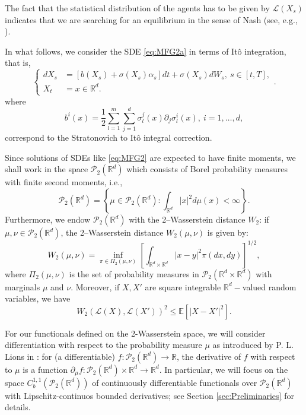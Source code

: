 \documentclass[12,english]{amsart}
\theoremstyle{plain}
\theoremstyle{definition}
\theoremstyle{plain}
\theoremstyle{plain}
\theoremstyle{remark}
\newcommand{\E}{\mathbb E}
\newcommand{\R}{\mathbb R}
\newcommand{\cL}{\mathcal L}
\newcommand{\cP}{\mathcal P}
\newcommand{\si}{\sigma}
\begin{document}
The fact that the statistical distribution of the agents has to be
given by $\cL(X_s)$ indicates that we are searching
for an equilibrium in the sense of Nash (see, e.g., \cite{carmona2018probabilistic}).

In what follows, we consider the SDE \eqref{eq:MFG2a} in terms of It\^{o} integration, that is, 
\begin{equation}
\begin{cases}
dX_s&=\left[b(X_s)+\si(X_s)\alpha_s\right]dt+\si(X_s)dW_s,~s\in\left[t,T\right],\\
X_t&=x\in\R^d.
\end{cases}.\label{eq:MFG2}
\end{equation}
where
\[
b^i(x)=\frac12\sum_{l=1}^m\sum_{j=1}^d\si_l^j(x)\partial_j\si_l^i(x),~i=1,\ldots,d,
\]
correspond to the Stratonovich to It\^o integral correction.

Since solutions of SDEs like \eqref{eq:MFG2} are expected to have
finite moments, we shall work in the space $\cP_2(\R^d)$
which consists of Borel probability measures with finite second moments,
i.e.,
\[
\cP_2(\R^d)=\left\{ \mu\in\cP_2(\R^d):\int_{\R^d}\left|x\right|^2d\mu(x)<\infty\right\} .
\]
Furthermore, we endow $\cP_2(\R^d)$
with the 2--Wasserstein distance $W_2$: if $\mu,\nu\in\cP_2(\R^d)$,
the 2--Wasserstein distance $W_2(\mu,\nu)$ is given
by:
\begin{equation}
W_2(\mu,\nu)=\inf_{\pi\in\Pi_2(\mu,\nu)}\left[\int_{\R^d\times\R^d}\left|x-y\right|^2\pi(dx,dy)\right]^{1/2},\label{eq:MK}
\end{equation}
where $\Pi_2(\mu,\nu)$ is the set of probability measures
in $\cP_2(\R^d\times\R^d)$
with marginals $\mu$ and $\nu$. Moreover, if $X,X'$ are square
integrable $\R^d-$valued random variables, we have
\[
W_2(\cL(X),\cL(X'))^2\leq \E\left[\left|X-X'\right|^2\right].
\]

For our functionals defined on the 2-Wasserstein space, we will consider differentiation with respect to the probability measure $\mu$ as introduced by P. L. Lions in \cite{cardaliaguet2010notes}: for  (a differentiable) $f:\cP_2(\R^d)\to\R$, the derivative of $f$ with respect to $\mu$ is a function $\partial_\mu{f}:\cP_2(\R^d)\times\R^d\to\R^d$. In particular, we will focus on the space $C^{1,1}_b(\cP_2(\R^d))$ of continuously differentiable functionals over $\cP_2(\R^d)$  with Lipschitz-continuos bounded derivatives; see Section \ref{sec:Preliminaries} for details.  
\end{document}
